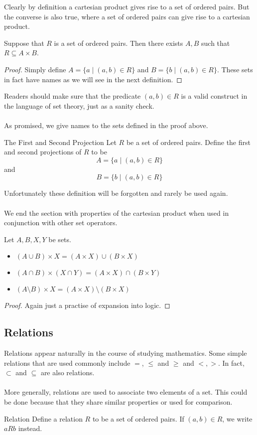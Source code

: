 \documentclass[a4paper]{article}
\begin{document}
Clearly by definition a cartesian product gives rise to a set of ordered pairs. But the converse is also true, where a set of ordered pairs can give rise to a cartesian product. 

\begin{prp}{}{} Suppose that $R$ is a set of ordered pairs. Then there exists $A,B$ such that $R\subseteq A\times B$. \tcbline
\begin{proof}
Simply define $A=\{a\;|\;(a,b)\in R\}$ and $B=\{b\;|\;(a,b)\in R\}$. These sets in fact have names as we will see in the next definition. 
\end{proof}
\end{prp}

Readers should make sure that the predicate $(a,b)\in R$ is a valid construct in the language of set theory, just as a sanity check. \\~\\
As promised, we give names to the sets defined in the proof above. 

\begin{defn}{The First and Second Projection}{} Let $R$ be a set of ordered pairs. Define the first and second projections of $R$ to be $$A=\{a\;|\;(a,b)\in R\}$$ and $$B=\{b\;|\;(a,b)\in R\}$$
\end{defn}

Unfortunately these definition will be forgotten and rarely be used again. \\~\\
We end the section with properties of the cartesian product when used in conjunction with other set operators. 

\begin{prp}{}{} Let $A,B,X,Y$ be sets. 
\begin{itemize}
\item $(A\cup B)\times X=(A\times X)\cup(B\times X)$
\item $(A\cap B)\times (X\cap Y)=(A\times X)\cap(B\times Y)$
\item $(A\setminus B)\times X=(A\times X)\setminus(B\times X)$
\end{itemize}\tcbline
\begin{proof} Again just a practise of expansion into logic. 
\end{proof}
\end{prp}

\subsection{Relations}
Relations appear naturally in the course of studying mathematics. Some simple relations that are used commonly include $=$, $\leq$ and $\geq$ and $<,>$. In fact, $\subset$ and $\subseteq$ are also relations. \\~\\
More generally, relations are used to associate two elements of a set. This could be done because that they share similar properties or used for comparison. 
\begin{defn}{Relation}{} Define a relation $R$ to be a set of ordered pairs. If $(a,b)\in R$, we write $aRb$ instead. 
\end{defn}
\end{document}
